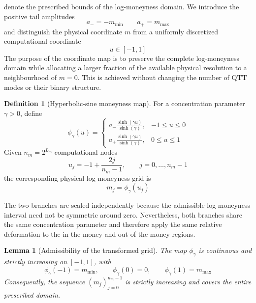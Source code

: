 \documentclass{article}
\numberwithin{equation}{subsection}
\newtheorem{lemma}[theorem]{Lemma}
\theoremstyle{definition}
\newtheorem{definition}[theorem]{Definition}
\theoremstyle{remark}
\begin{document}
denote the prescribed bounds of the log-moneyness domain. We introduce the positive tail amplitudes
\begin{equation}
a_-=-m_{\min}
\qquad
a_+=m_{\max}
\end{equation}
and distinguish the physical coordinate \(m\) from a uniformly discretized computational coordinate
\begin{equation}
u\in[-1,1]
\end{equation}
The purpose of the coordinate map is to preserve the complete log-moneyness domain while allocating a larger fraction of the available physical resolution to a neighbourhood of \(m=0\). This is achieved without changing the number of QTT modes or their binary structure.
\begin{definition}[Hyperbolic-sine moneyness map]
For a concentration parameter \(\gamma>0\), define
\[
\phi_\gamma(u)
=
\begin{cases}
\displaystyle
a_-\frac{\sinh(\gamma u)}{\sinh(\gamma)},
& -1\leq u\leq 0
\\[1.2ex]
\displaystyle
a_+\frac{\sinh(\gamma u)}{\sinh(\gamma)},
& 0\leq u\leq 1
\end{cases}
\]
Given \(n_m=2^{L_m}\) computational nodes
\[
u_j=-1+\frac{2j}{n_m-1},
\qquad
j=0,\ldots,n_m-1
\]
the corresponding physical log-moneyness grid is
\[
m_j=\phi_\gamma(u_j)
\]
\end{definition}
The two branches are scaled independently because the admissible log-moneyness interval need not be symmetric around zero. Nevertheless, both branches share the same concentration parameter and therefore apply the same relative deformation to the in-the-money and out-of-the-money regions.
\begin{lemma}[Admissibility of the transformed grid]
The map \(\phi_\gamma\) is continuous and strictly increasing on \([-1,1]\), with
\[
\phi_\gamma(-1)=m_{\min},
\qquad
\phi_\gamma(0)=0,
\qquad
\phi_\gamma(1)=m_{\max}
\]
Consequently, the sequence \((m_j)_{j=0}^{n_m-1}\) is strictly increasing and covers the entire prescribed domain.
\end{lemma}
\end{document}
